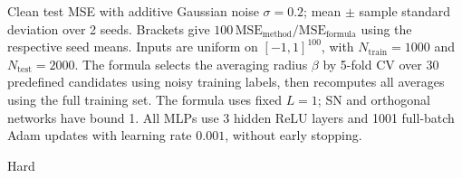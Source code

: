 \documentclass[10pt]{article}
\begin{document}
\clearpage
\begin{table}[t]
\centering
\footnotesize
\setlength{\tabcolsep}{3pt}
\caption{Clean test MSE with additive Gaussian noise $\sigma=0.2$; mean $\pm$ sample standard deviation over 2 seeds. Brackets give $100\,\mathrm{MSE}_{\mathrm{method}}/\mathrm{MSE}_{\mathrm{formula}}$ using the respective seed means. Inputs are uniform on $[-1,1]^{100}$, with $N_{\mathrm{train}}=1000$ and $N_{\mathrm{test}}=2000$. The formula selects the averaging radius $\beta$ by 5-fold CV over 30 predefined candidates using noisy training labels, then recomputes all averages using the full training set. The formula uses fixed $L=1$; SN and orthogonal networks have bound 1. All MLPs use 3 hidden ReLU layers and 1001 full-batch Adam updates with learning rate $0.001$, without early stopping.}
\label{tab:noisy-0p2-ratio1}
\begin{subtable}{\textwidth}
\centering
\caption{Hard}
\label{tab:noisy-0p2-ratio1-1}
\end{subtable}
\par\medskip
\begin{subtable}{\textwidth}
\centering
\caption{Tied}
\label{tab:noisy-0p2-ratio1-2}
\end{subtable}
\end{table}
\end{document}

